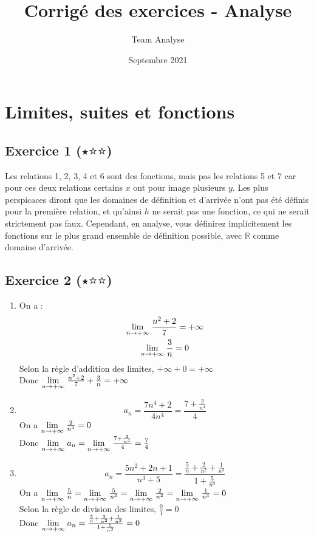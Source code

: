 \documentclass{article}
\title{Corrigé des exercices - Analyse}
\author{Team Analyse}
\date{Septembre 2021}
\newcommand{\Lim}[1]{\raisebox{0.0ex}{\scalebox{1}{$\displaystyle \lim_{#1}\;$}}}
\newcommand{\R}{\mathbb{R}}
\begin{document}
\maketitle

\section{Limites, suites et fonctions}
\subsection{Exercice 1 ($\medblackstar \medwhitestar \medwhitestar$)}

Les relations 1, 2, 3, 4 et 6 sont des fonctions, mais pas les relations 5 et 7 car pour ces deux relations certains $x$ ont pour image plusieurs $y$. Les plus perspicaces diront que les domaines de définition et d'arrivée n'ont pas été définis pour la première relation, et qu'ainsi $h$ ne serait pas une fonction, ce qui ne serait strictement pas faux. Cependant, en analyse, vous définirez implicitement les fonctions sur le plus grand ensemble de définition possible, avec $\R$ comme domaine d'arrivée.

\subsection{Exercice 2 ($\medblackstar \medwhitestar \medwhitestar$)}

\begin{enumerate}
    \item On a :
    \begin{gather*}
        \Lim{n \to + \infty} \frac{n^2 + 2}{7} = +\infty\\
        \Lim{n \to + \infty} \frac{3}{n} = 0
    \end{gather*}
    Selon la règle d'addition des limites, $+\infty + 0 = +\infty$\\
    Donc $\Lim{n \to + \infty} \frac{n^2 + 2}{7} + \frac{3}{n} = +\infty$\\
    \item $$a_n = \frac{7n^4 + 2}{4n^4} = \frac{7 + \frac{2}{n^4}}{4}$$
    On a $\Lim{n \to + \infty} \frac{2}{n^4} = 0$\\
    Donc $\Lim{n \to + \infty} a_n = \Lim{n \to + \infty} \frac{7 + \frac{2}{n^4}}{4} = \frac{7}{4}$\\
    \item $$a_n = \frac{5n^2 + 2n + 1}{n^3 + 5} = \frac{\frac{5}{n} + \frac{2}{n^2} + \frac{1}{n^3}}{1 + \frac{5}{n^3}}$$
    On a $\Lim{n \to + \infty} \frac{5}{n} = \Lim{n \to + \infty} \frac{5}{n^3} = \Lim{n \to + \infty} \frac{2}{n^2} = \Lim{n \to + \infty} \frac{1}{n^3} = 0$\\
    Selon la règle de division des limites, $\frac{0}{1} = 0$\\
    Donc $\Lim{n \to + \infty} a_n = \frac{\frac{5}{n} + \frac{2}{n^2} + \frac{1}{n^3}}{1 + \frac{5}{n^3}} = 0$\\
\end{enumerate}
\end{document}
